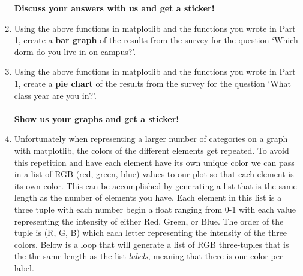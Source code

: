 \documentclass[11pt, letterpaper, onecolumn, oneside, final]{article}
\begin{document}
\begin{enumerate}
\textbf{Discuss your answers with us and get a sticker!}
\item Using the above functions in {\consolas matplotlib} and the functions you wrote in Part 1, create a \textbf{bar graph} of the results from the survey for the question `Which dorm do you live in on campus?'. 
\item Using the above functions in {\consolas matplotlib} and the functions you wrote in Part 1, create a \textbf{pie chart} of the results from the survey for the question `What class year are you in?'.\\\\
\textbf{Show us your graphs and get a sticker!}
\item Unfortunately when representing a larger number of categories on a graph with {\consolas matplotlib}, the colors of the different elements get repeated. To avoid this repetition and have each element have its own unique color we can pass in a list of RGB (red, green, blue) values to our plot so that each element is its own color. This can be accomplished by generating a list that is the same length as the number of elements you have. Each element in this list is a three tuple with each number begin a {\consolas float} ranging from 0-1 with each value representing the intensity of either Red, Green, or Blue. The order of the tuple is (R, G, B) which each letter representing the intensity of the three colors. Below is a loop that will generate a list of RGB three-tuples that is the the same length as the list \textit{labels}, meaning that there is one color per label. 


\end{enumerate}
\end{document}
